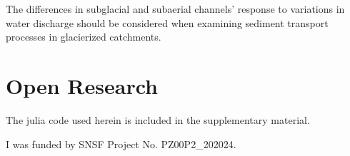 \documentclass[draft]{agujournal2019}
\begin{document}
The differences in subglacial and subaerial channels' response to variations in water discharge should be considered when examining sediment transport processes in glacierized catchments.


\section*{Open Research}
\noindent
The julia code used herein is included in the supplementary material.



\acknowledgments
I was funded by SNSF Project No. PZ00P2\_202024.



% 
% 








\end{document}
